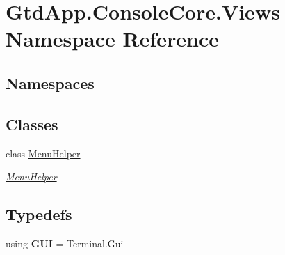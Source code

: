 \hypertarget{namespace_gtd_app_1_1_console_core_1_1_views}{}\section{Gtd\+App.\+Console\+Core.\+Views Namespace Reference}
\label{namespace_gtd_app_1_1_console_core_1_1_views}
\subsection*{Namespaces}
\begin{DoxyCompactItemize}
\end{DoxyCompactItemize}
\subsection*{Classes}
\begin{DoxyCompactItemize}
\item 
class \mbox{\hyperlink{class_gtd_app_1_1_console_core_1_1_views_1_1_menu_helper}{Menu\+Helper}}
\begin{DoxyCompactList}\small\item\em \mbox{\hyperlink{class_gtd_app_1_1_console_core_1_1_views_1_1_menu_helper}{Menu\+Helper}} \end{DoxyCompactList}\end{DoxyCompactItemize}
\subsection*{Typedefs}
\begin{DoxyCompactItemize}
\item 
\mbox{\label{namespace_gtd_app_1_1_console_core_1_1_views_a24b643bd0313df000f069080cc115333}} 
using {\bfseries G\+UI} = Terminal.\+Gui
\end{DoxyCompactItemize}
